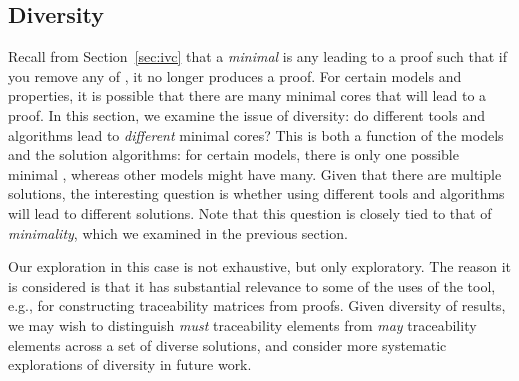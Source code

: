 \subsection{Diversity}
\label{sec:diversity}



Recall from Section~\ref{sec:ivc} that a {\em minimal}   is any
 leading to a proof such that if you remove any of , it no longer produces a proof. For certain models and
properties, it is possible that there are many minimal cores that will
lead to a proof. In this section, we examine the issue of diversity:
do different tools and algorithms lead to {\em different} minimal
cores? This is both a function of the models and the solution
algorithms: for certain models, there is only one possible minimal
, whereas other models might have many. Given that there are
multiple solutions, the interesting question is whether using
different tools and algorithms will lead to different solutions. Note
that this question is closely tied to that of {\em minimality}, which
we examined in the previous section.

Our exploration in this case is not exhaustive, but only exploratory.
The reason it is considered is that it has substantial relevance to
some of the uses of the tool, e.g., for constructing traceability
matrices from proofs. Given diversity of results, we may wish to
distinguish {\em must} traceability elements from {\em may}
traceability elements across a set of diverse solutions, and consider
more systematic explorations of diversity in future work.

